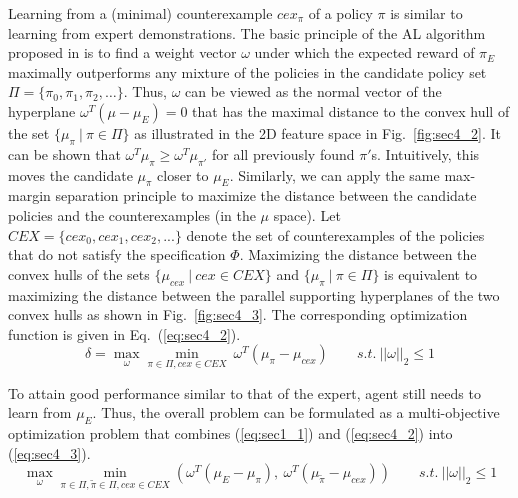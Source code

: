 Learning from a (minimal) counterexample $cex_{\pi}$ of a policy $\pi$ is similar to learning from expert demonstrations. The basic principle of the AL algorithm proposed in \cite{Abbeel:2004:ALV:1015330.1015430} is to find a weight vector $\omega$ under which the expected reward of $\pi_E$ maximally outperforms any mixture of the policies in the candidate policy set $\Pi=\{\pi_0, \pi_1, \pi_2, \ldots\}$. Thus, $\omega$ can be viewed as the normal vector of the hyperplane $\omega^T(\mu - \mu_E) = 0$ that has the maximal distance to the convex hull of the set $\{\mu_{\pi}\:|\:\pi\in\Pi\}$ as illustrated in the 2D feature space in Fig.~\ref{fig:sec4_2}. 
It can be shown that $\omega^T \mu_\pi \geq \omega^T \mu_{\pi'}$ for all previously found $\pi'$s. Intuitively, this moves the candidate $\mu_\pi$ closer to $\mu_E$.
Similarly, we can apply the same max-margin separation principle to maximize the distance between the candidate policies and the counterexamples (in the $\mu$ space).     
Let ${CEX}= \{cex_0, cex_1, cex_2, ...\}$ denote the set of counterexamples of the policies that do not satisfy the specification $\Phi$. 
Maximizing the distance between the convex hulls of the sets $\{\mu_{cex}\:|\:cex\in{CEX}\}$ and $\{\mu_{\pi}\:|\:\pi\in\Pi\}$ is equivalent to maximizing the distance between the parallel supporting hyperplanes of the two convex hulls as shown in Fig.~\ref{fig:sec4_3}. The corresponding optimization function is given in Eq.~(\ref{eq:sec4_2}).
\begin{equation}
\delta = \max\limits_{\omega}\min\limits_{\pi\in\Pi, cex\in CEX}\ \omega^T(\mu_{\pi}-\mu_{cex})\label{eq:sec4_2}\qquad s.t.\:||\omega||_2\leq 1
\end{equation}

To attain good performance similar to that of the expert, agent still needs to learn from $\mu_E$. Thus, the overall problem can be formulated as a multi-objective optimization problem that combines (\ref{eq:sec1_1}) and (\ref{eq:sec4_2}) into (\ref{eq:sec4_3}).
\begin{equation}
\max\limits_\omega \min\limits_{\pi \in \Pi, \tilde\pi \in \Pi, cex \in CEX} (\omega^T (\mu_E - \mu_{\pi}),\ \omega^T (\mu_{\tilde\pi} - \mu_{cex}) )\qquad s.t.\:||\omega||_2\leq 1
\label{eq:sec4_3}
\end{equation}